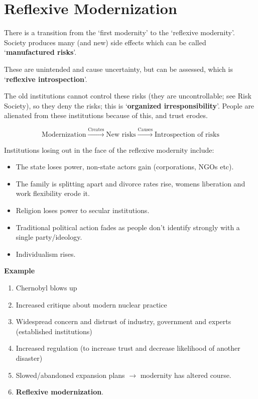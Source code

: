 \section{Reflexive Modernization}

There is a transition from the `first modernity' to the `reflexive
modernity'. Society produces many (and new) side effects which can be
called `\textbf{manufactured risks}'.

These are unintended and cause uncertainty, but can be assessed, which
is `\textbf{reflexive introspection}'.

The old institutions cannot control these risks (they are
uncontrollable; see Risk Society), so they deny the risks; this is
`\textbf{organized irresponsibility}'. People are alienated from these
institutions because of this, and trust erodes.

\[
  \text{Modernization} \xrightarrow{\text{Creates}} \text{New risks}
  \xrightarrow{\text{Causes}} \text{Introspection of risks}
\]

Institutions losing out in the face of the reflexive modernity include:
\begin{itemize}
  \item The state loses power, non-state actors gain (corporations,
    NGOs etc).
  \item The family is splitting apart and divorce rates rise, womens
    liberation and work flexibility erode it.
  \item Religion loses power to secular institutions.
  \item Traditional political action fades as people don't identify
    strongly with a single party/ideology.
  \item Individualism rises.
\end{itemize}

\textbf{Example}
\begin{enumerate}
  \item Chernobyl blows up
  \item Increased critique about modern nuclear practice
  \item Widespread concern and distrust of industry, government and
    experts (established institutions)
  \item Increased regulation (to increase trust and decrease likelihood
    of another disaster)
  \item Slowed/abandoned expansion plans $\rightarrow$ modernity has
    altered course.
  \item \textbf{Reflexive modernization}.
\end{enumerate}

